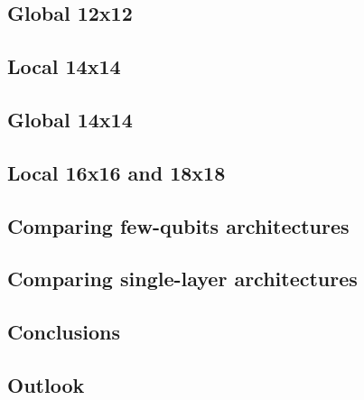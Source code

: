 \subsection{Global 12x12}


\subsection{Local 14x14}


\subsection{Global 14x14}


\subsection{Local 16x16 and 18x18}

\subsection{Comparing few-qubits architectures}

\subsection{Comparing single-layer architectures}

\subsection{Conclusions}

\subsection{Outlook}

